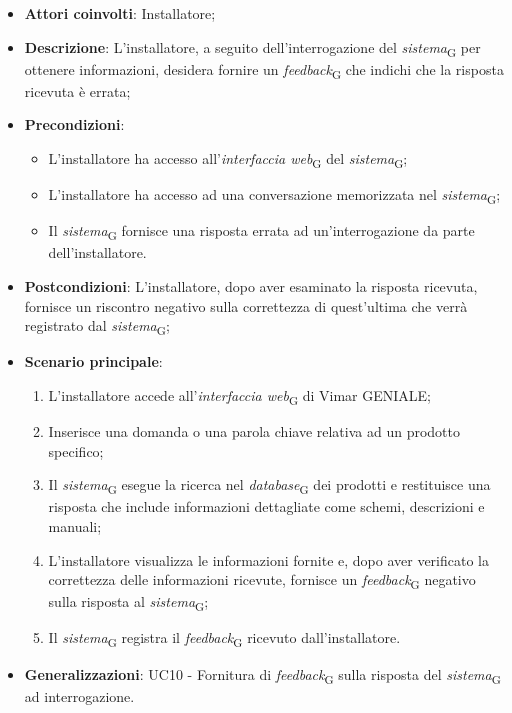 \begin{itemize}
    \item \textbf{Attori coinvolti}: Installatore;
    \item \textbf{Descrizione}: L’installatore, a seguito dell’interrogazione del \textit{sistema}\textsubscript{G} per ottenere informazioni, desidera fornire un \textit{feedback}\textsubscript{G} che indichi che la risposta ricevuta è errata;
    \item \textbf{Precondizioni}: 
    \begin{itemize}
        \item L’installatore ha accesso all’\textit{interfaccia web}\textsubscript{G} del \textit{sistema}\textsubscript{G};
        \item L’installatore ha accesso ad una conversazione memorizzata nel \textit{sistema}\textsubscript{G};
        \item Il \textit{sistema}\textsubscript{G} fornisce una risposta errata ad un’interrogazione da parte dell’installatore.
    \end{itemize}
    \item \textbf{Postcondizioni}: L’installatore, dopo aver esaminato la risposta ricevuta, fornisce un riscontro negativo sulla correttezza di quest’ultima che verrà registrato dal \textit{sistema}\textsubscript{G};
    \item \textbf{Scenario principale}:
    \begin{enumerate}
        \item L’installatore accede all’\textit{interfaccia web}\textsubscript{G} di Vimar GENIALE;
        \item Inserisce una domanda o una parola chiave relativa ad un prodotto specifico;
        \item Il \textit{sistema}\textsubscript{G} esegue la ricerca nel \textit{database}\textsubscript{G} dei prodotti e restituisce una risposta che include informazioni dettagliate come schemi, descrizioni e manuali;
        \item L’installatore visualizza le informazioni fornite e, dopo aver verificato la correttezza delle informazioni ricevute, fornisce un \textit{feedback}\textsubscript{G} negativo sulla risposta al \textit{sistema}\textsubscript{G};
        \item Il \textit{sistema}\textsubscript{G} registra il \textit{feedback}\textsubscript{G} ricevuto dall’installatore.
    \end{enumerate}
    \item \textbf{Generalizzazioni}: UC10 - Fornitura di \textit{feedback}\textsubscript{G} sulla risposta del \textit{sistema}\textsubscript{G} ad interrogazione.
\end{itemize}



